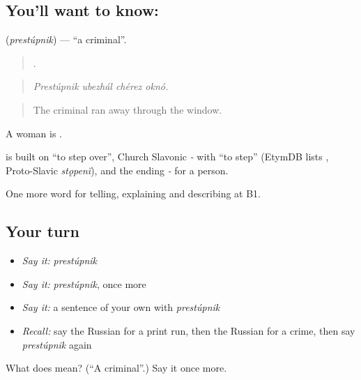 \subsection*{You'll want to know: }
\textbf{} (\emph{prestúpnik}) — \textquotedblleft{}a criminal\textquotedblright{}.

\begin{quote}
   .
\end{quote}

\begin{quote}
\emph{Prestúpnik ubezhál chérez oknó.}
\end{quote}

\begin{quote}
The criminal ran away through the window.
\end{quote}

A woman is \emph{}.

\begin{cousinweb}
\emph{} is built on \emph{} \textquotedblleft{}to step over\textquotedblright{}, Church Slavonic \emph{-} with \emph{} \textquotedblleft{}to step\textquotedblright{} (EtymDB lists \emph{}, Proto-Slavic \emph{stǫpenĭ}), and the ending \emph{-} for a person.
\end{cousinweb}

\begin{grammarlens}[title={What you've built}]
One more word for telling, explaining and describing at B1.
\end{grammarlens}

\subsection*{Your turn}
\begin{itemize}
\raggedright
  \item \emph{Say it:} \emph{prestúpnik}
  \item \emph{Say it:} \emph{prestúpnik}, once more
  \item \emph{Say it:} a sentence of your own with \emph{prestúpnik}
  \item \emph{Recall:} say the Russian for a print run, then the Russian for a crime, then say \emph{prestúpnik} again
\end{itemize}

\begin{tcolorbox}[breakable,colback=teal!4,colframe=teal!35!black,title={Before you move on}]
What does  mean? (\textquotedblleft{}A criminal\textquotedblright{}.) Say it once more.
\end{tcolorbox}

